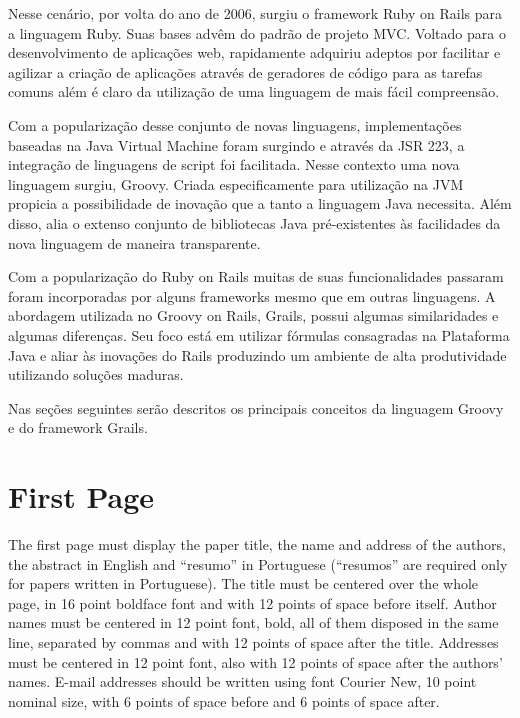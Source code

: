 \documentclass[12pt]{article}
\begin{document}
    Nesse cenário, por volta do ano de 2006, surgiu o framework Ruby on Rails para a linguagem Ruby. Suas bases advêm do padrão de
    projeto MVC. Voltado para o desenvolvimento de aplicações web, rapidamente adquiriu adeptos por facilitar e agilizar a criação 
    de aplicações através de geradores de código para as tarefas comuns além é claro da utilização de uma linguagem de mais fácil
    compreensão.

    Com a popularização desse conjunto de novas linguagens, implementações baseadas na Java Virtual Machine foram surgindo e através 
    da JSR 223, a integração de linguagens de script foi facilitada. Nesse contexto uma nova linguagem surgiu, Groovy. Criada especificamente
    para utilização na JVM propicia a possibilidade de inovação que a tanto a linguagem Java necessita. Além disso, alia o extenso 
    conjunto de bibliotecas Java pré-existentes às facilidades da nova linguagem de maneira transparente. 
    
    Com a popularização do Ruby on Rails muitas de suas funcionalidades passaram foram incorporadas por alguns frameworks mesmo que em 
    outras linguagens. A abordagem utilizada no Groovy on Rails, Grails, possui algumas similaridades e algumas diferenças. Seu foco está
    em utilizar fórmulas consagradas na Plataforma Java e aliar às inovações do Rails produzindo um ambiente de alta produtividade utilizando
    soluções maduras.
    
    Nas seções seguintes serão descritos os principais conceitos da linguagem Groovy e do framework Grails.

\section{First Page} \label{sec:firstpage}

The first page must display the paper title, the name and address of the
authors, the abstract in English and ``resumo'' in Portuguese (``resumos'' are
required only for papers written in Portuguese). The title must be centered
over the whole page, in 16 point boldface font and with 12 points of space
before itself. Author names must be centered in 12 point font, bold, all of
them disposed in the same line, separated by commas and with 12 points of
space after the title. Addresses must be centered in 12 point font, also with
12 points of space after the authors' names. E-mail addresses should be
written using font Courier New, 10 point nominal size, with 6 points of space
before and 6 points of space after.
\end{document}
